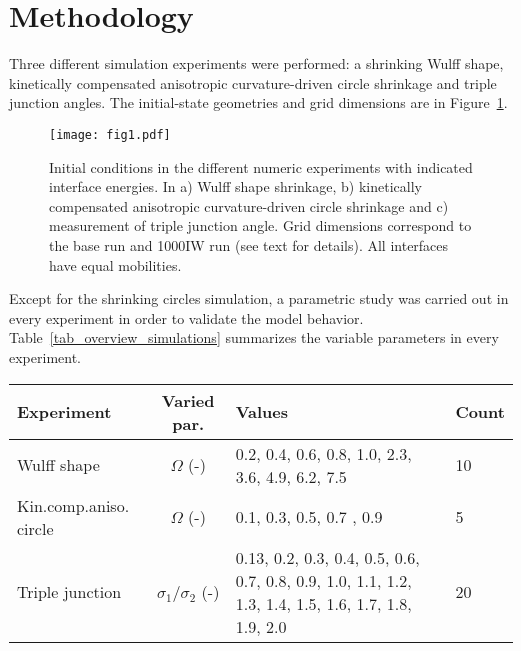 \section{Methodology}
Three different simulation experiments were performed: a shrinking Wulff shape, kinetically compensated anisotropic curvature-driven circle shrinkage and triple junction angles. The initial-state geometries and grid dimensions are in Figure~\ref{fig_IC_sketch}. 
\label{sec_Numeric}
\begin{figure}[]
	\centering
	\texttt{[image: fig1.pdf]}
	\caption{Initial conditions in the different numeric experiments with indicated interface energies. In a) Wulff shape shrinkage, b) kinetically compensated anisotropic curvature-driven circle shrinkage and c)  measurement of triple junction angle.  Grid dimensions correspond to the base run and 1000IW run (see text for details). All interfaces have equal mobilities.}
	\label{fig_IC_sketch}
\end{figure} 
Except for the shrinking circles simulation, a parametric study was carried out in every experiment in order to validate the model behavior. Table~\ref{tab_overview_simulations} summarizes the variable parameters in every experiment.
\begin{table*}[]
	\centering
	\caption{Overview of the simulations carried out in every simulation experiment. Note that these were carried out in every model modification (i.e. IWc, IWvG and IWvK) and simulation run (see Table~\ref{tab_IW_settings}). Number of simulations in every experiment is provided in the column Count. See text for more details.}
	\label{tab_overview_simulations}
	\begin{tabular}{lc|p{3.2cm}|l}
		\toprule
		Experiment          & Varied par.                   & Values                   & Count \\ \hline
		Wulff shape         & $\Omega$ (-)                  & 0.2, 0.4, 0.6, 0.8, 1.0, 2.3, 3.6, 4.9, 6.2, 7.5 & 10 \\ \hline
		Kin.comp.aniso. circle & $\Omega$ (-)                  & 0.1, 0.3, 0.5, 0.7 , 0.9       & 5 \\ \hline
		Triple junction     & $\sigma_1/\sigma_2$ (-)       & 0.13, 0.2, 0.3, 0.4, 0.5, 0.6, 0.7, 0.8, 0.9, 1.0, 1.1, 1.2, 1.3, 1.4, 1.5, 1.6, 1.7, 1.8, 1.9, 2.0  & 20 \\
		\bottomrule
	\end{tabular}
\end{table*}

